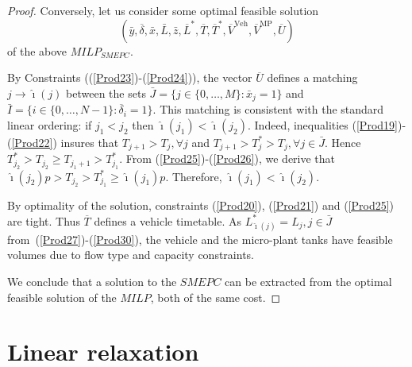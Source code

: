 \documentclass[11pt]{article}
\theoremstyle{plain}%
\theoremstyle{definition} \newtheorem{lem}{Lemma}[section]
\theoremstyle{definition} \newtheorem{claim}{Claim}[lem]
\theoremstyle{definition} \newtheorem{theorem}{Theorem}[section]
\theoremstyle{definition} \newtheorem{exo}{Exercice n$^\circ$}
\theoremstyle{definition} \newtheorem{quest}{}[exo]
\theoremstyle{definition} \newtheorem{sousquest}{}[quest]
\theoremstyle{remark}
\theoremstyle{definition}
\begin{document}
\begin{proof}

Conversely, let us consider some optimal feasible solution $$(\bar{y},\overline{\delta},\bar{x},\bar{L},\bar{z},\overline{L}^*,\overline{T},\overline{T}^*, \overline{V}^{\textrm{Veh}},\overline{V}^{\textrm{MP}},\overline{U})$$ of the above $MILP_{SMEPC}$.

 By Constraints ((\ref{Prod23})-(\ref{Prod24})), the vector $\overline{U}$ defines a matching $j \rightarrow \hat{\imath}(j)$
between the sets $\bar{J}=\{j \in \{0, \ldots,M\}: \bar{x}_j=1 \} $ and
$\bar{I}=\{i \in \{0, \ldots,N-1\}: \overline{\delta}_i=1 \}$. 
This matching is consistent with the standard linear ordering: 
if $j_1 < j_2$ then $\hat{\imath}({j_1}) < \hat{\imath}({j_2})$. 
Indeed, inequalities (\ref{Prod19})-(\ref{Prod22}) insures that $T_{j+1} > T_j, \forall j$
and $T_{j+1} > T^*_j > T_j, \forall j \in \bar{J}$. Hence 
$T^*_{j_2} > T_{j_2} \geq T_{j_1+1} > T^*_{j_1} $.
From (\ref{Prod25})-(\ref{Prod26}), we derive that $\hat{\imath}({j_2}) p > T_{j_2} >  T^*_{j_1} \geq \hat{\imath}({j_1}) p$.
Therefore, $\hat{\imath}({j_1}) < \hat{\imath}({j_2}) $.

By optimality of the solution, constraints (\ref{Prod20}), (\ref{Prod21}) and (\ref{Prod25}) are tight. 
Thus $\overline{T}$ defines a vehicle timetable. As $L^*_{\hat{\imath}(j)} = L_j, j \in \bar{J}$
 from~(\ref{Prod27})-(\ref{Prod30}),  the vehicle and the micro-plant tanks
have feasible volumes due to flow type and capacity constraints.

We conclude that a solution to the $SMEPC$ 
can be extracted from the optimal feasible solution of the $MILP$, both of
the same cost. 

\end{proof}

\section{Linear relaxation }\label{sec4}
\end{document}
